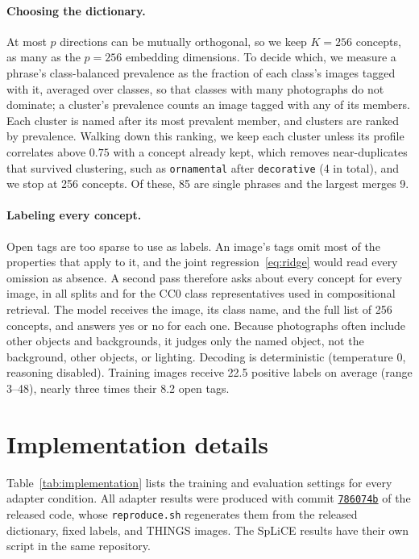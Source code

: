 \documentclass[mlmain,onecolumn]{jmlr}
\begin{document}
\paragraph{Choosing the dictionary.} At most $p$ directions can be mutually orthogonal, so we keep $K=256$ concepts, as many as the $p=256$ embedding dimensions. To decide which, we measure a phrase's class-balanced prevalence as the fraction of each class's images tagged with it, averaged over classes, so that classes with many photographs do not dominate; a cluster's prevalence counts an image tagged with any of its members. Each cluster is named after its most prevalent member, and clusters are ranked by prevalence. Walking down this ranking, we keep each cluster unless its profile correlates above $0.75$ with a concept already kept, which removes near-duplicates that survived clustering, such as \texttt{ornamental} after \texttt{decorative} (4 in total), and we stop at 256 concepts. Of these, 85 are single phrases and the largest merges 9.

\paragraph{Labeling every concept.} Open tags are too sparse to use as labels. An image's tags omit most of the properties that apply to it, and the joint regression~\eqref{eq:ridge} would read every omission as absence. A second pass therefore asks about every concept for every image, in all splits and for the CC0 class representatives used in compositional retrieval. The model receives the image, its class name, and the full list of 256 concepts, and answers yes or no for each one. Because photographs often include other objects and backgrounds, it judges only the named object, not the background, other objects, or lighting. Decoding is deterministic (temperature 0, reasoning disabled). Training images receive 22.5 positive labels on average (range 3--48), nearly three times their 8.2 open tags.

\section{Implementation details}
\label{apd:implementation}

Table~\ref{tab:implementation} lists the training and evaluation settings for every adapter condition. All adapter results were produced with commit \href{https://github.com/markjouh/conceptbasis/tree/786074beed8c5d23681731fbddeecc54195f0188}{\texttt{786074b}} of the released code, whose \texttt{reproduce.sh} regenerates them from the released dictionary, fixed labels, and THINGS images. The SpLiCE results have their own script in the same repository.
\end{document}
